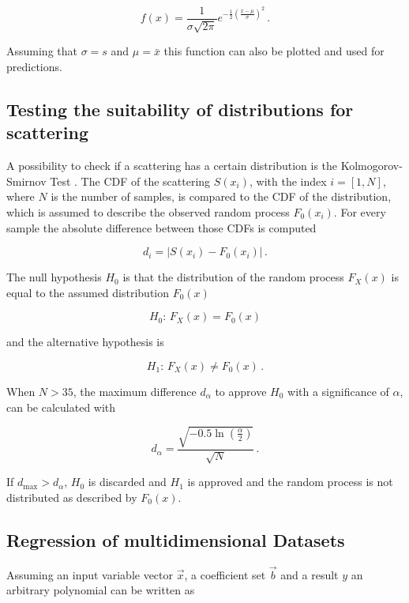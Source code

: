 \begin{equation}
f\left( x \right) = \frac{1}{\sigma\sqrt{2\pi}}e^{-\frac{1}{2}\left(\frac{x-\mu}{\sigma}\right)^2}\,.
\end{equation}

Assuming that $\sigma = s$ and $\mu = \bar{x}$ this function can also be plotted and used for predictions.

\subsection{Testing the suitability of distributions for scattering}

A possibility to check if a scattering has a certain distribution is the Kolmogorov-Smirnov Test \cite{kosmi}. The \ac{CDF} of the scattering $S\left( x_i\right)$, with the index $i=[1,N]$, where $N$ is the number of samples, is compared to the \ac{CDF} of the distribution, which is assumed to describe the observed random process $F_0\left( x_i\right)$. For every sample the absolute difference between those \ac{CDF}s is computed

\begin{equation}
d_i = |S\left( x_i\right)-F_0\left( x_i\right)|\,.
\end{equation}

The null hypothesis $H_0$ is that the distribution of the random process $F_X\left( x\right)$ is equal to the assumed distribution $F_0\left( x\right)$

\begin{equation}
H_0:\, F_X\left( x\right)=F_0\left( x\right)
\end{equation}

and the alternative hypothesis is

\begin{equation}
H_1:\, F_X\left( x\right)\neq F_0\left( x\right)\,.
\end{equation}

When $N>35$, the maximum difference $d_\alpha$ to approve $H_0$ with a significance of $\alpha$, can be calculated with

\begin{equation}
d_\alpha=\frac{\sqrt{-0.5\ln\left(\frac{\alpha}{2}\right)}}{\sqrt{N}}\,.
\end{equation}

If $d_\text{max}>d_\alpha$, $H_0$ is discarded and $H_1$ is approved and the random process is not distributed as described by $F_0\left( x\right)$.

\subsection{Regression of multidimensional Datasets}
\label{sec:regod} 
Assuming an input variable vector $\vec{x}$, a coefficient set $\vec{b}$ and a result $y$ an arbitrary polynomial can be written as \cite{sip}

